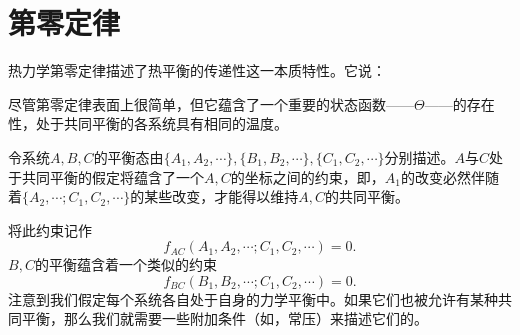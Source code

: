 \section{第零定律}

	热力学第零定律描述了热平衡的传递性这一本质特性。它说：


	尽管第零定律表面上很简单，但它蕴含了一个重要的状态函数——\(\Theta\)——的存在性，处于共同平衡的各系统具有相同的温度。


	令系统\(A,B,C\)的平衡态由\(\{A_1,A_2,\cdots\},\{B_1,B_2,\cdots\},\{C_1,C_2,\cdots\}\)分别描述。$A$与$C$处于共同平衡的假定将蕴含了一个$A,C$的坐标之间的约束，即，\(A_1\)的改变必然伴随着\(\{A_2,\cdots;C_1,C_2,\cdots\}\)的某些改变，才能得以维持\(A,C\)的共同平衡。

	将此约束记作
	\begin{equation}
		f_{AC}(A_1,A_2,\cdots;C_1,C_2,\cdots)=0.
	\end{equation}
	$B,C$的平衡蕴含着一个类似的约束
	\begin{equation}
		f_{BC}(B_1,B_2,\cdots;C_1,C_2,\cdots)=0.
	\end{equation}
	注意到我们假定每个系统各自处于自身的力学平衡中。如果它们也被允许有某种共同平衡，那么我们就需要一些附加条件（如，常压）来描述它们的。

